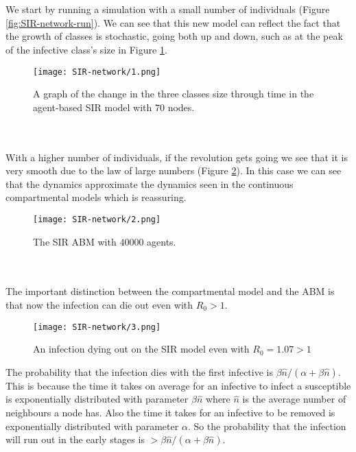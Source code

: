 \\
\\
We start by running a simulation with a small number of individuals (Figure \ref{fig:SIR-network-run}). We can see that this new model can reflect the fact that the growth of classes is stochastic, going both up and down, such as at the peak of the infective class's size in Figure \ref{fig:SIR-graph-1}.
\begin{figure}[h!]
	\centering
	\texttt{[image: SIR-network/1.png]}
	\caption{A graph of the change in the three classes size through time in the agent-based SIR model with $70$ nodes.}
	\label{fig:SIR-graph-1}
\end{figure}\\
\\
With a higher number of individuals, if the revolution gets going we see that it is very smooth due to the law of large numbers (Figure \ref{fig:SIR-graph-2}). In this case we can see that the dynamics approximate the dynamics seen in the continuous compartmental models which is reassuring.
\begin{figure}[h!]
	\centering
	\texttt{[image: SIR-network/2.png]}
	\caption{The SIR ABM with $40000$ agents.}
	\label{fig:SIR-graph-2}
\end{figure}\\
\\
The important distinction between the compartmental model and the ABM is that now the infection can die out even with $R_0>1$.
\begin{figure}[h!]
	\centering
	\texttt{[image: SIR-network/3.png]}
	\caption{An infection dying out on the SIR model even with $R_0=1.07>1$}
	\label{fig:SIR-graph-3}
\end{figure}
The probability that the infection dies with the first infective is $\beta\hat n/(\alpha+\beta\hat n)$. This is because the time it takes on average for an infective to infect a susceptible is exponentially distributed with parameter $\beta \hat n$ where $\hat n$ is the average number of neighbours a node has. Also the time it takes for an infective to be removed is exponentially distributed with parameter $\alpha$. So the probability that the infection will run out in the early stages is $>\beta\hat n/(\alpha+\beta\hat n)$.
